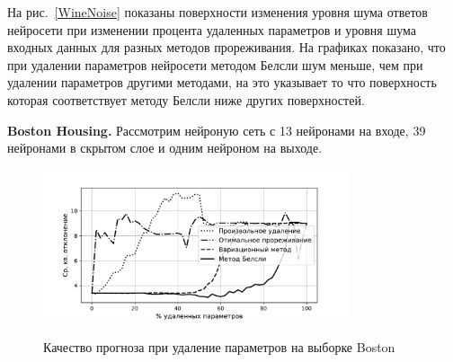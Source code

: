 На рис.~\ref{WineNoise} показаны поверхности изменения уровня шума ответов нейросети при изменении процента удаленных параметров и уровня шума входных данных для разных методов прореживания. На графиках показано, что при удалении параметров нейросети методом Белсли шум меньше, чем при удалении параметров другими методами, на это указывает то что поверхность которая соответствует методу Белсли ниже других поверхностей.

\textbf{Boston Housing.} Рассмотрим нейроную сеть с 13 нейронами на входе, 39 нейронами в скрытом слое и одним нейроном на выходе.

\begin{figure}[h!t]\center
\includegraphics[width=0.8\textwidth]{plots/grabovoy/Boston/All.pdf}\\
\caption{Качество прогноза при удаление параметров на выборке Boston}
\label{BostonAll}
\end{figure}


